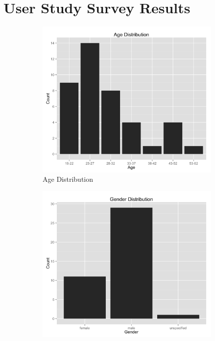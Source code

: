 \chapter{User Study Survey Results}


\begin{figure}[H]
\centering
\begin{subfigure}{.5\textwidth}
    \centering
    \includegraphics[width=1.0\linewidth]{../study-2/results/graphs/age.png}
    \caption{Age Distribution}
    \label{agedistribution}
\end{subfigure}%
\begin{subfigure}{.5\textwidth}
    \centering
    \includegraphics[width=1.0\linewidth]{../study-2/results/graphs/gender.png}

\end{subfigure}
\end{figure}
